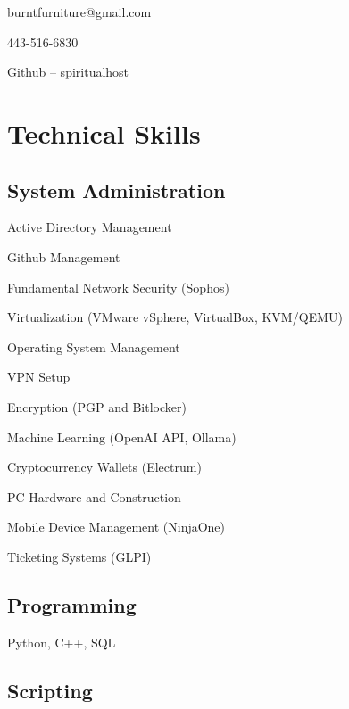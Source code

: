 \documentclass{article}
\makeatletter
\renewcommand{\maketitle}{
	\begin{center}
		{\huge\bfseries\theauthor}
		
		\vspace{.5em}

		burntfurniture@gmail.com

		443-516-6830

		\href{https://github.com/spiritualhost}{Github -- spiritualhost}
	\end{center}
}
\makeatother
\begin{document}
\noindent

\author{Ryan Piazza}

\maketitle

\section{Technical Skills}

\subsection{System Administration}
\vspace{-1em} %

\begin{multicols}{2}
	\begin{compactitem}
		\item Active Directory Management
		\item Github Management
		\item Fundamental Network Security (Sophos)
		\item Virtualization (VMware vSphere, VirtualBox, KVM/QEMU)
		\item Operating System Management
		\item VPN Setup
		\item Encryption (PGP and Bitlocker)
		\item Machine Learning (OpenAI API, Ollama)
		\item Cryptocurrency Wallets (Electrum)
		\item PC Hardware and Construction
		\item Mobile Device Management (NinjaOne)
		\item Ticketing Systems (GLPI)
	\end{compactitem}
\end{multicols}

\subsection{Programming}

Python, C++, SQL

\subsection{Scripting} 
\end{document}
